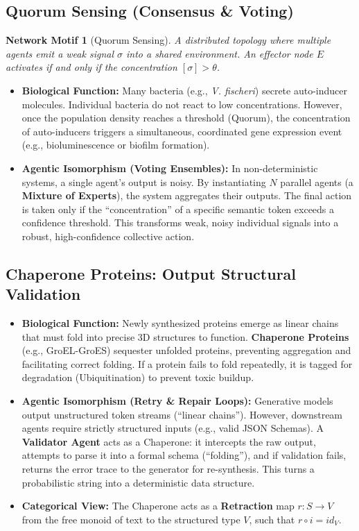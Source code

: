 \documentclass[11pt, a4paper]{article}
\newtheorem{motif}{Network Motif}
\begin{document}
\subsection{Quorum Sensing (Consensus \& Voting)}

\begin{motif}[Quorum Sensing]
A distributed topology where multiple agents emit a weak signal $\sigma$ into a shared environment. An effector node $E$ activates if and only if the concentration $[\sigma] > \theta$.
\end{motif}

\begin{itemize}
    \item \textbf{Biological Function:} Many bacteria (e.g., \textit{V. fischeri}) secrete auto-inducer molecules. Individual bacteria do not react to low concentrations. However, once the population density reaches a threshold (Quorum), the concentration of auto-inducers triggers a simultaneous, coordinated gene expression event (e.g., bioluminescence or biofilm formation).
    \item \textbf{Agentic Isomorphism (Voting Ensembles):} In non-deterministic systems, a single agent's output is noisy. By instantiating $N$ parallel agents (a \textbf{Mixture of Experts}), the system aggregates their outputs. The final action is taken only if the ``concentration'' of a specific semantic token exceeds a confidence threshold. This transforms weak, noisy individual signals into a robust, high-confidence collective action.
\end{itemize}

\subsection{Chaperone Proteins: Output Structural Validation}
\begin{itemize}
    \item \textbf{Biological Function:} Newly synthesized proteins emerge as linear chains that must fold into precise 3D structures to function. \textbf{Chaperone Proteins} (e.g., GroEL-GroES) sequester unfolded proteins, preventing aggregation and facilitating correct folding. If a protein fails to fold repeatedly, it is tagged for degradation (Ubiquitination) to prevent toxic buildup.
    \item \textbf{Agentic Isomorphism (Retry \& Repair Loops):} Generative models output unstructured token streams (``linear chains''). However, downstream agents require strictly structured inputs (e.g., valid JSON Schemas). A \textbf{Validator Agent} acts as a Chaperone: it intercepts the raw output, attempts to parse it into a formal schema (``folding''), and if validation fails, returns the error trace to the generator for re-synthesis. This turns a probabilistic string into a deterministic data structure.
    \item \textbf{Categorical View:} The Chaperone acts as a \textbf{Retraction} map $r: S \to V$ from the free monoid of text to the structured type $V$, such that $r \circ i = id_V$.
\end{itemize}
\end{document}
